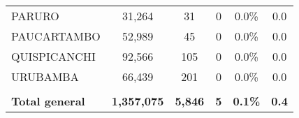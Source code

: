 \begin{tabular}{lccccc}
	\cellcolor[HTML]{C6E0B4}PARURO                                  & 31,264               & 31                         & 0                    & 0.0\%                      & 0.0                                         \\
	\cellcolor[HTML]{C6E0B4}PAUCARTAMBO                             & 52,989               & 45                         & 0                    & 0.0\%                      & 0.0                                         \\
	\cellcolor[HTML]{C6E0B4}QUISPICANCHI                            & 92,566               & 105                        & 0                    & 0.0\%                      & 0.0                                         \\
	\cellcolor[HTML]{C6E0B4}URUBAMBA                                & 66,439               & 201                        & 0                    & 0.0\%                      & 0.0                                         \\
	& \multicolumn{1}{l}{} & \multicolumn{1}{l}{}       & \multicolumn{1}{l}{} & \multicolumn{1}{l}{}       & \multicolumn{1}{l}{}                        \\
	\rowcolor[HTML]{DDEBF7} 
	\textbf{Total general}                                          & \textbf{1,357,075}   & \textbf{5,846}             & \textbf{5}           & \textbf{0.1\%}             & \textbf{0.4}                               
\end{tabular}